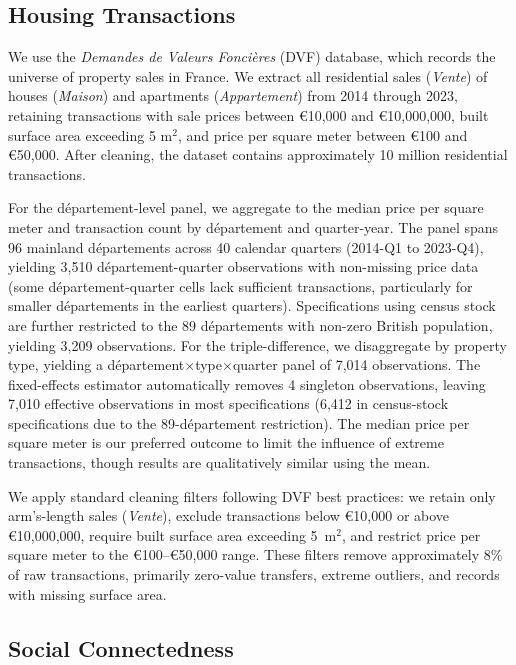 \documentclass[12pt]{article}
\renewcommand{\EUR}[1]{\euro{}#1}
\begin{document}
\subsection{Housing Transactions}

We use the \textit{Demandes de Valeurs Fonci\`eres} (DVF) database, which records the universe of property sales in France. We extract all residential sales (\textit{Vente}) of houses (\textit{Maison}) and apartments (\textit{Appartement}) from 2014 through 2023, retaining transactions with sale prices between \EUR{10,000} and \EUR{10,000,000}, built surface area exceeding 5 m$^2$, and price per square meter between \EUR{100} and \EUR{50,000}. After cleaning, the dataset contains approximately 10 million residential transactions.

For the d\'epartement-level panel, we aggregate to the median price per square meter and transaction count by d\'epartement and quarter-year. The panel spans 96 mainland d\'epartements across 40 calendar quarters (2014-Q1 to 2023-Q4), yielding 3,510 d\'epartement-quarter observations with non-missing price data (some d\'epartement-quarter cells lack sufficient transactions, particularly for smaller d\'epartements in the earliest quarters). Specifications using census stock are further restricted to the 89 d\'epartements with non-zero British population, yielding 3,209 observations. For the triple-difference, we disaggregate by property type, yielding a d\'epartement$\times$type$\times$quarter panel of 7,014 observations. The fixed-effects estimator automatically removes 4 singleton observations, leaving 7,010 effective observations in most specifications (6,412 in census-stock specifications due to the 89-d\'epartement restriction). The median price per square meter is our preferred outcome to limit the influence of extreme transactions, though results are qualitatively similar using the mean.

We apply standard cleaning filters following DVF best practices: we retain only arm's-length sales (\textit{Vente}), exclude transactions below \EUR{10,000} or above \EUR{10,000,000}, require built surface area exceeding 5~m$^2$, and restrict price per square meter to the \EUR{100}--\EUR{50,000} range. These filters remove approximately 8\% of raw transactions, primarily zero-value transfers, extreme outliers, and records with missing surface area.

\subsection{Social Connectedness}
\end{document}

